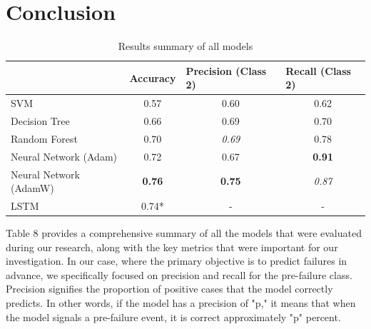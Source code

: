 \documentclass{article}
\begin{document}
\section{Conclusion}

\begin{table}[htbp]
\caption{Results summary of all models}
\centering
\begin{tabular}{l|c|c|c|}
\cline{2-4}
                                             & \multicolumn{1}{l|}{Accuracy} & \multicolumn{1}{l|}{Precision (Class 2)} & \multicolumn{1}{l|}{Recall (Class 2)} \\ \hline
\multicolumn{1}{|l|}{SVM}                    & 0.57                          & 0.60                                     & 0.62                                  \\
\multicolumn{1}{|l|}{Decision Tree}          & 0.66                          & 0.69                                     & 0.70                                  \\
\multicolumn{1}{|l|}{Random Forest}          & 0.70                          & \textit{0.69}                            & 0.78                                  \\
\multicolumn{1}{|l|}{Neural Network (Adam)}  & 0.72                          & 0.67                                     & \textbf{0.91}                         \\
\multicolumn{1}{|l|}{Neural Network (AdamW)} & \textbf{0.76}                 & \textbf{0.75}                            & \textit{0.87}                         \\
\multicolumn{1}{|l|}{LSTM}                   & 0.74*                         & -                                    & -                                 \\ \hline
\end{tabular}
\end{table}

Table 8 provides a comprehensive summary of all the models that were evaluated during our research, along with the key metrics that were important for our investigation. In our case, where the primary objective is to predict failures in advance, we specifically focused on precision and recall for the pre-failure class.\\

Precision signifies the proportion of positive cases that the model correctly predicts. In other words, if the model has a precision of "p," it means that when the model signals a pre-failure event, it is correct approximately "p" percent.\\
\end{document}
